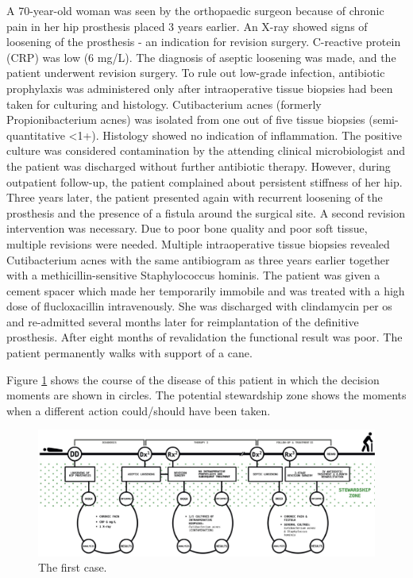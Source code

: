 \documentclass[
]{book}
\begin{document}
A 70-year-old woman was seen by the orthopaedic surgeon because of chronic pain in her hip prosthesis placed 3 years earlier. An X-ray showed signs of loosening of the prosthesis - an indication for revision surgery. C-reactive protein (CRP) was low (6 mg/L). The diagnosis of aseptic loosening was made, and the patient underwent revision surgery. To rule out low-grade infection, antibiotic prophylaxis was administered only after intraoperative tissue biopsies had been taken for culturing and histology. Cutibacterium acnes (formerly Propionibacterium acnes) was isolated from one out of five tissue biopsies (semi-quantitative \textless1+). Histology showed no indication of inflammation. The positive culture was considered contamination by the attending clinical microbiologist and the patient was discharged without further antibiotic therapy. However, during outpatient follow-up, the patient complained about persistent stiffness of her hip. Three years later, the patient presented again with recurrent loosening of the prosthesis and the presence of a fistula around the surgical site. A second revision intervention was necessary. Due to poor bone quality and poor soft tissue, multiple revisions were needed. Multiple intraoperative tissue biopsies revealed Cutibacterium acnes with the same antibiogram as three years earlier together with a methicillin-sensitive Staphylococcus hominis. The patient was given a cement spacer which made her temporarily immobile and was treated with a high dose of flucloxacillin intravenously. She was discharged with clindamycin per os and re-admitted several months later for reimplantation of the definitive prosthesis. After eight months of revalidation the functional result was poor. The patient permanently walks with support of a cane.

Figure \ref{fig:fig2-2} shows the course of the disease of this patient in which the decision moments are shown in circles. The potential stewardship zone shows the moments when a different action could/should have been taken.

\begin{figure}

{\centering \includegraphics[width=1\linewidth]{images/02-02} 

}

\caption{The first case.}\label{fig:fig2-2}
\end{figure}
\end{document}
